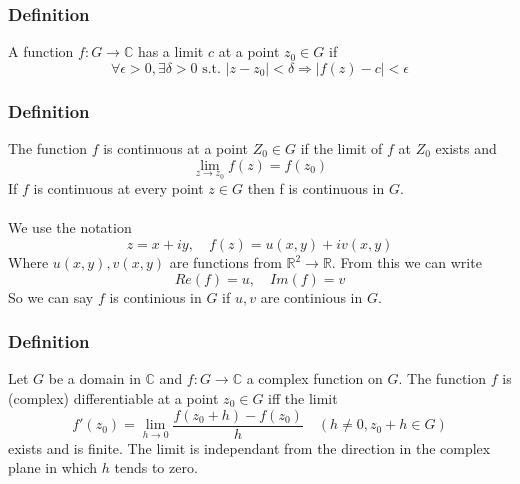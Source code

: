 \documentclass[a4paper, 12pt, twoside]{article}
\begin{document}
                \subsubsection{Definition}
                    A function $f:G \to  \mathbb{C}$ has a limit $c$ at a point $z_{0}\in G$ if
                    $$\forall\epsilon>0,\exists\delta>0\text{ s.t. } |z-z_{0}|<\delta \Rightarrow |f(z)-c|<\epsilon$$
                \subsubsection{Definition}
                    The function $f$ is continuous at a point $Z_{0}\in G$ if the limit of $f$ at $Z_{0}$ exists and
                    $$ \lim_{z\to z_{0}}f(z)=f(z_{0})$$
                    If $f$ is continuous at every point $z\in G$ then f is continuous in $G$.\\\\
                    We use the notation
                    $$z = x+iy,\quad f(z)=u(x,y)+iv(x,y) $$
                    Where $u(x,y),v(x,y)$ are functions from $\mathbb{R}^{2}\to \mathbb{R}$. From this we can write
                    $$ Re(f)=u,\quad Im(f)=v$$
                    So we can say $f$ is continious in $G$ if $u,v$ are continious in $G$.
                \subsubsection{Definition}
                    Let $G$ be a domain in $\mathbb{C}$ and $f:G \to  \mathbb{C}$ a complex function on $G$. The function $f$ is (complex) differentiable at a point $z_{0}\in G$ iff the limit
                    $$ f'(z_{0})=\lim_{h\to0}\frac{f(z_{0}+h)-f(z_{0})}{h}\quad(h\neq 0, z_{0}+h\in G)$$
                    exists and is finite.
                    The limit is independant from the direction in the complex plane in which $h$ tends to zero.
\end{document}
